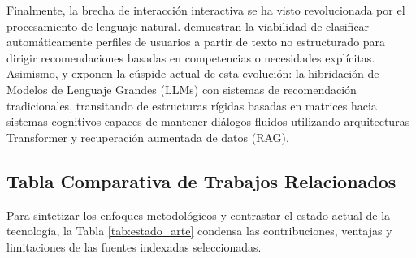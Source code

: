 \documentclass[12pt]{article}
\begin{document}
    Finalmente, la brecha de interacción interactiva se ha visto revolucionada por el procesamiento de lenguaje natural. \textcite{chihab2025ai} demuestran la viabilidad de clasificar automáticamente perfiles de usuarios a partir de texto no estructurado para dirigir recomendaciones basadas en competencias o necesidades explícitas. Asimismo, \textcite{munson2025review} y \textcite{sabiri2025hybrid} exponen la cúspide actual de esta evolución: la hibridación de Modelos de Lenguaje Grandes (LLMs) con sistemas de recomendación tradicionales, transitando de estructuras rígidas basadas en matrices hacia sistemas cognitivos capaces de mantener diálogos fluidos utilizando arquitecturas Transformer y recuperación aumentada de datos (RAG).

    \subsection{Tabla Comparativa de Trabajos Relacionados}

    Para sintetizar los enfoques metodológicos y contrastar el estado actual de la tecnología, la Tabla \ref{tab:estado_arte} condensa las contribuciones, ventajas y limitaciones de las fuentes indexadas seleccionadas.
\end{document}
